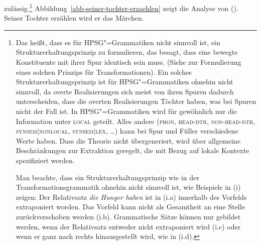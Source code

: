 zulässig.\footnote{
        Das heißt, dass es für HPSG"=Grammatiken nicht sinnvoll ist, ein Strukturerhaltungsprinzip
        zu formulieren,
        das besagt, dass eine bewegte Konstituente mit ihrer Spur identisch sein muss. (Siehe \zb
         zur Formulierung eines solchen Prinzips für Transformationen). Ein solches Strukturerhaltungsprinzip
        ist für HPSG"=Grammatiken ohnehin nicht sinnvoll, da overte Realisierungen sich meist von
        ihren Spuren dadurch unterscheiden, dass die overten Realisierungen Töchter haben, was bei Spuren
        nicht der Fall ist. In HPSG"=Grammatiken wird für gewöhnlich nur die Information unter \textsc{local}
        geteilt. Alles andere (\textsc{phon}, \textsc{head-dtr}, \textsc{non-head-dtr}, \textsc{synsem$|$nonlocal},
        \textsc{synsem$|$lex}, \ldots) kann bei Spur und Füller verschiedene Werte haben. Dass die Theorie nicht übergeneriert,
        wird über allgemeine Beschränkungen zur Extraktion geregelt, die mit Bezug auf lokale Kontexte
        spezifiziert werden.

        Man beachte, dass ein Strukturerhaltungsprinzip wie in der Transformationsgrammatik ohnehin
        nicht sinnvoll ist, wie  Beispiele in (i) zeigen:
        \eal
        \zl
        Der Relativsatz \emph{die Hunger haben} ist in (i.a) innerhalb des Vorfelds extraponiert worden. Das
        Vorfeld kann nicht als Gesamtheit an eine Stelle zurückverschoben werden (i.b). Grammatische Sätze
        können nur gebildet werden, wenn der Relativsatz entweder nicht extraponiert wird (i.c) oder
        wenn er ganz nach rechts hinausgestellt wird, wie in (i.d).
}
Abbildung~\vref{abb-seiner-tochter-erzaehlen} zeigt die Analyse von ().
\ea
Seiner Tochter erzählen wird er das Märchen.
\z
